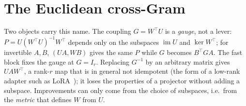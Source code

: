\documentclass[11pt,a4paper]{article}
\theoremstyle{plain}
\theoremstyle{definition}
\theoremstyle{remark}
\newcommand{\im}{\operatorname{im}}
\newcommand{\T}{\top}
\begin{document}
\section{The Euclidean cross-Gram}
\label{sec:crossgram}
Two objects carry this name. The coupling $G=W^\T U$ is a \emph{gauge}, not a
lever: $P=U(W^\T U)^{-1}W^\T$ depends only on the subspaces $\im U$ and
$\ker W^\T$; for invertible $A,B$, $(UA,WB)$ gives the same $P$ while $G$
becomes $B^\T GA$. The fast block fixes the gauge at $G=I_r$. Replacing
$G^{-1}$ by an arbitrary matrix gives $UAW^\T$, a rank-$r$ map that is in
general not idempotent (the form of a low-rank adapter such as
LoRA~\cite{hu2022lora}); it loses the properties of a projector without
adding a subspace.
Improvements can only come from the choice of subspaces, i.e.\ from the
\emph{metric} that defines $W$ from $U$.
\end{document}
